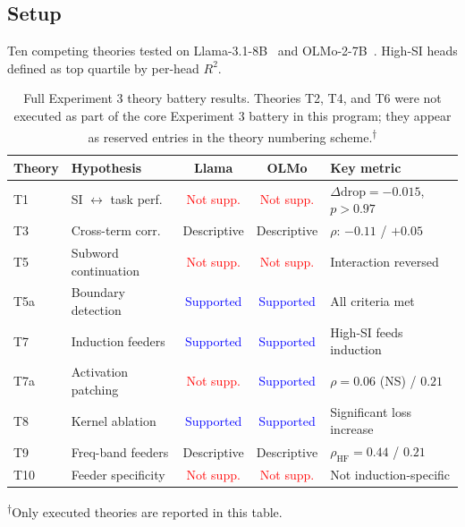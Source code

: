 \documentclass{article}
\begin{document}
\subsection{Setup}

Ten competing theories tested on Llama-3.1-8B~\citep{dubey2024llama3} and
OLMo-2-7B~\citep{groeneveld2024olmo}. High-SI heads defined as top quartile by per-head $R^2$.

\begin{table}[htbp]
    \caption{Full Experiment 3 theory battery results. Theories T2, T4, and T6 were not
    executed as part of the core Experiment 3 battery in this program; they appear as
    reserved entries in the theory numbering scheme.\textsuperscript{$\dagger$}}
    \centering
    \small
    \begin{tabular}{llccp{4.2cm}}
        \toprule
        Theory & Hypothesis & Llama & OLMo & Key metric \\
        \midrule
        T1 & SI $\leftrightarrow$ task perf. & \textcolor{red}{Not supp.} &
            \textcolor{red}{Not supp.} & $\Delta\text{drop} = -0.015$, $p > 0.97$ \\
        T3 & Cross-term corr. & Descriptive & Descriptive & $\rho$: $-0.11$ / $+0.05$ \\
        T5 & Subword continuation & \textcolor{red}{Not supp.} & \textcolor{red}{Not supp.}
            & Interaction reversed \\
        T5a & Boundary detection & \textcolor{blue}{Supported} & \textcolor{blue}{Supported}
            & All criteria met \\
        T7 & Induction feeders & \textcolor{blue}{Supported} & \textcolor{blue}{Supported}
            & High-SI feeds induction \\
        T7a & Activation patching & \textcolor{red}{Not supp.} & \textcolor{blue}{Supported}
            & $\rho = 0.06$ (NS) / $0.21$ \\
        T8 & Kernel ablation & \textcolor{blue}{Supported} & \textcolor{blue}{Supported}
            & Significant loss increase \\
        T9 & Freq-band feeders & Descriptive & Descriptive & $\rho_{\text{HF}} = 0.44$ / $0.21$ \\
        T10 & Feeder specificity & \textcolor{red}{Not supp.} & \textcolor{red}{Not supp.}
            & Not induction-specific \\
        \bottomrule
    \end{tabular}
\end{table}
\noindent\textsuperscript{$\dagger$}Only executed theories are reported in this table.
\end{document}
